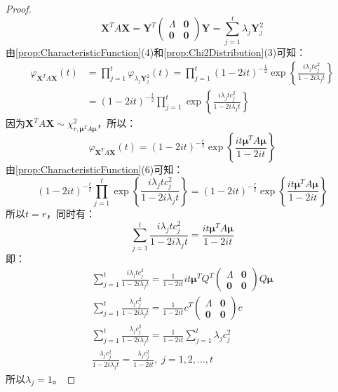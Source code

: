 \begin{proof}
	\begin{equation*}
		\mathbf{X}^TA\mathbf{X}=\mathbf{Y}^T
		\begin{pmatrix}
			\varLambda & \mathbf{0} \\
			\mathbf{0} & \mathbf{0}
		\end{pmatrix}\mathbf{Y}=\sum_{j=1}^{t}\lambda_j\mathbf{Y}_j^2
	\end{equation*}
	由\cref{prop:CharacteristicFunction}(4)和\cref{prop:Chi2Distribution}(3)可知：
	\begin{align*}
		\varphi_{\mathbf{X}^TA\mathbf{X}}(t)
		&=\prod_{j=1}^{t}\varphi_{\lambda_j\mathbf{Y}_j^2}(t)=\prod_{j=1}^t(1-2it)^{-\frac{1}{2}}\exp\left\{\frac{i\lambda_jtc_j^2}{1-2i\lambda_jt}\right\} \\
		&=(1-2it)^{-\frac{t}{2}}\prod_{j=1}^t\exp\left\{\frac{i\lambda_jtc_j^2}{1-2i\lambda_jt}\right\}
	\end{align*}
	因为$\mathbf{X}^TA\mathbf{X}\sim\chi_{r,\boldsymbol{\mu}^TA\boldsymbol{\mu}}^2$，所以：
	\begin{equation*}
		\varphi_{\mathbf{X}^TA\mathbf{X}}(t)=(1-2it)^{-\frac{r}{2}}\exp\left\{\frac{it\boldsymbol{\mu}^TA\boldsymbol{\mu}}{1-2it}\right\}
	\end{equation*}
	由\cref{prop:CharacteristicFunction}(6)可知：
	\begin{equation*}
		(1-2it)^{-\frac{t}{2}}\prod_{j=1}^t\exp\left\{\frac{i\lambda_jtc_j^2}{1-2i\lambda_jt}\right\}=(1-2it)^{-\frac{r}{2}}\exp\left\{\frac{it\boldsymbol{\mu}^TA\boldsymbol{\mu}}{1-2it}\right\}
	\end{equation*}
	所以$t=r$，同时有：
	\begin{equation*}
		\sum_{j=1}^{t}\frac{i\lambda_jtc_j^2}{1-2i\lambda_jt}=\frac{it\boldsymbol{\mu}^TA\boldsymbol{\mu}}{1-2it}
	\end{equation*}
	即：
	\begin{gather*}
		\sum_{j=1}^{t}\frac{i\lambda_jtc_j^2}{1-2i\lambda_jt}=\frac{1}{1-2it}it\boldsymbol{\mu}^TQ^T
		\begin{pmatrix}
			\varLambda & \mathbf{0} \\
			\mathbf{0} & \mathbf{0}
		\end{pmatrix}
		Q\boldsymbol{\mu} \\
		\sum_{j=1}^{t}\frac{\lambda_jc_j^2}{1-2i\lambda_jt}=\frac{1}{1-2it}c^T
		\begin{pmatrix}
			\varLambda & \mathbf{0} \\
			\mathbf{0} & \mathbf{0}
		\end{pmatrix}
		c \\
		\sum_{j=1}^{t}\frac{\lambda_jc_j^2}{1-2i\lambda_jt}=\frac{1}{1-2it}\sum_{j=1}^{t}\lambda_jc_j^2 \\
		\frac{\lambda_jc_j^2}{1-2i\lambda_jt}=\frac{\lambda_jc_j^2}{1-2it},\;j=1,2,\dots,t
	\end{gather*}
	所以$\lambda_j=1$。
\end{proof}
